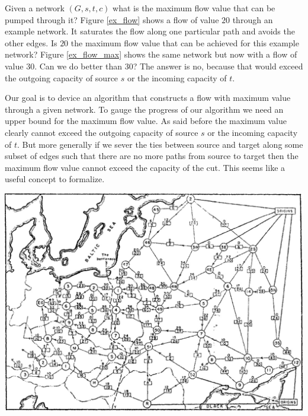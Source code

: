 Given a network $(G, s, t, c)$ what is the maximum flow value that can be pumped through it? Figure \ref{ex_flow} shows a flow of value $20$ through an example network. It saturates the flow along one particular path and avoids the other edges. Is $20$ the maximum flow value that can be achieved for this example network? Figure \ref{ex_flow_max} shows the same network but now with a flow of value $30$. Can we do better than $30$? The answer is no, because that would exceed the outgoing capacity of source $s$ or the incoming capacity of $t$. 

Our goal is to device an algorithm that constructs a flow with maximum value through a given network. To gauge the progress of our algorithm we need an upper bound for the maximum flow value. As said before the maximum value clearly cannot exceed the outgoing capacity of source $s$ or the incoming capacity of $t$. But more generally if we sever the ties between source and target along some subset of edges such that there are no more paths from source to target then the maximum flow value cannot exceed the capacity of the cut. This seems like a useful concept to formalize.

\begin{marginfigure}[1in]
\includegraphics[scale=0.15]{soviettrainnetwork.jpeg}
\end{marginfigure}

